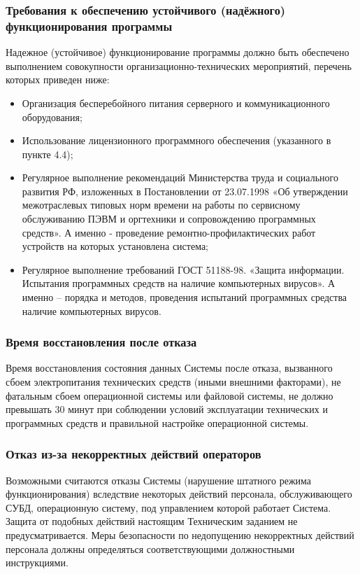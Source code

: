     \subsubsection{Требования к обеспечению устойчивого (надёжного) функционирования программы}
      Надежное (устойчивое) функционирование программы должно быть обеспечено выполнением совокупности организационно-технических мероприятий, перечень которых приведен ниже:
      \begin{itemize}
        \item Организация бесперебойного питания серверного и коммуникационного оборудования;
        \item Использование лицензионного программного обеспечения (указанного в пункте 4.4);
        \item Регулярное выполнение рекомендаций Министерства труда и социального развития РФ, изложенных в Постановлении от 23.07.1998 «Об утверждении межотраслевых типовых норм времени на работы по сервисному обслуживанию ПЭВМ и оргтехники и сопровождению программных средств». А именно -  проведение ремонтно-профилактических работ устройств на которых установлена система;
        \item Регулярное выполнение требований ГОСТ 51188-98. «Защита информации. Испытания программных средств на наличие компьютерных вирусов». А именно – порядка и методов, проведения испытаний программных средства наличие компьютерных вирусов. 
    \end{itemize}
    \subsubsection{Время восстановления после отказа}
      Время восстановления состояния данных Системы после отказа, вызванного сбоем электропитания технических средств (иными внешними факторами), не фатальным сбоем операционной системы или файловой системы, не должно превышать 30 минут при соблюдении условий эксплуатации технических и программных средств и правильной настройке операционной системы.
    \subsubsection{Отказ из-за некорректных действий операторов}
      Возможными считаются отказы Системы (нарушение штатного режима функционирования) вследствие некоторых действий персонала, обслуживающего СУБД, операционную систему, под управлением которой работает Система. Защита от подобных действий настоящим Техническим заданием не предусматривается. Меры безопасности по недопущению некорректных действий персонала должны определяться соответствующими должностными инструкциями.
